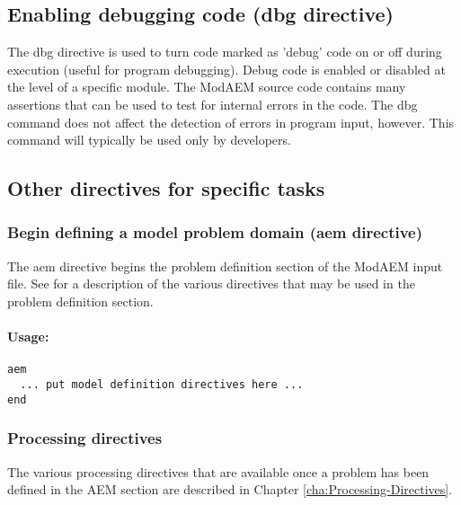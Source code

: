 \subsection{Enabling debugging code (\textsf{\textsf{dbg}} directive) }

The \textsf{dbg} directive is used to turn code marked as 'debug'
code on or off during execution (useful for program debugging). Debug
code is enabled or disabled at the level of a specific module. The
ModAEM source code contains many assertions that can be used to test
for internal errors in the code. The \textsf{dbg} command does not
affect the detection of errors in program input, however. This command
will typically be used only by developers.

\subsection{Other directives for specific tasks }

\subsubsection{Begin defining a model problem domain (\textsf{aem} directive)}

The \textsf{aem} directive begins the problem definition section of the ModAEM
input file. See for a description of the various directives that may
be used in the problem definition section.
\paragraph{Usage:}
\begin{verbatim}
aem 
  ... put model definition directives here ... 
end
\end{verbatim}

\subsubsection{Processing directives}

The various processing directives that are available once a problem
has been defined in the AEM section are described in Chapter \ref{cha:Processing-Directives}.

